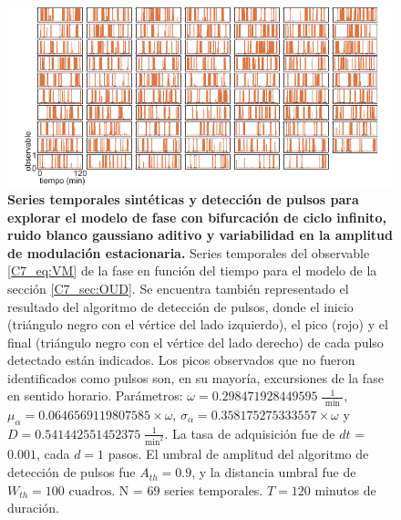 \documentclass[./main.tex]{subfiles}
\begin{document}
\begin{subappendices}
\begin{figure}
    \centering
    \includegraphics[width=1\columnwidth]{figures/chapter7/C7_dist_traces_for_evaluation_VM.pdf} 
    \caption{\textbf{Series temporales sintéticas y detección de pulsos para explorar el modelo de fase con bifurcación de ciclo infinito, ruido blanco gaussiano aditivo y variabilidad en la amplitud de modulación estacionaria.} Series temporales del observable \ref{C7_eq:VM} de la fase en función del tiempo para el modelo de la sección \ref{C7_sec:OUD}. Se encuentra también representado el resultado del algoritmo de detección de pulsos, donde el inicio (triángulo negro con el vértice del lado izquierdo), el pico (rojo) y el final (triángulo negro con el vértice del lado derecho) de cada pulso detectado están indicados. Los picos observados que no fueron identificados como pulsos son, en su mayoría, excursiones de la fase en sentido horario. Parámetros: $\omega = 0.298471928449595 \; \frac{1}{\text{ min }}$, $\mu_{\alpha} = 0.0646569119807585 \times \omega$, $ \sigma_{\alpha} = 0.358175275333557  \times \omega$ y $D = 0.541442551452375 \; \frac{1}{\text{min}^{2}}$. La tasa de adquisición fue de $dt$ = $0.001$, cada $d = 1$ pasos. El umbral de amplitud del algoritmo de detección de pulsos fue $A_{th} = 0.9$, y la distancia umbral fue de $W_{th} = 100\text{ cuadros}$. N = $69$ series temporales. $T = 120$ minutos de duración.}
    \label{C7_fig:dist_traces_VM}
\end{figure}

\end{subappendices}
\end{document}
